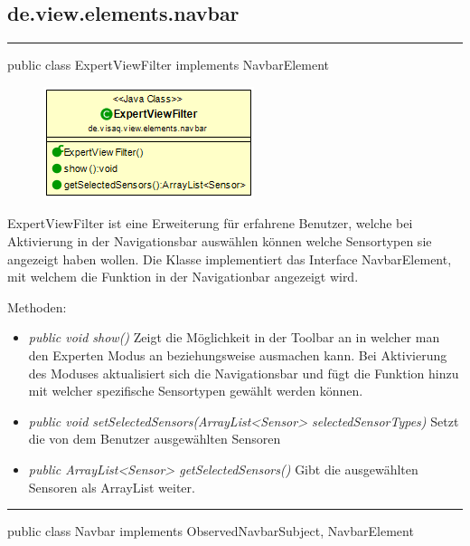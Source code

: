 \subsection{de.view.elements.navbar}

\rule{\textwidth}{0.4pt} 
public class ExpertViewFilter implements NavbarElement 

\begin{minipage}{0.3\textwidth}
    \begin{figure}[H]
        \includegraphics[scale = 0.5]{media/frontend/view/de.view.elements.navbar/ExpertviewFilter_Class.png}
    \end{figure}
    \end{minipage} \hfill
    \begin{minipage}{0.6\textwidth}
ExpertViewFilter ist eine Erweiterung für erfahrene Benutzer, welche bei Aktivierung in der Navigationsbar auswählen können welche Sensortypen sie angezeigt haben wollen. Die Klasse implementiert das Interface NavbarElement, mit welchem die Funktion in der Navigationbar angezeigt wird.
\end{minipage}

Methoden:
\begin{itemize} 
    \item \emph{public void show()} Zeigt die Möglichkeit in der Toolbar an in welcher man den Experten Modus an beziehungsweise ausmachen kann. Bei Aktivierung des Moduses aktualisiert sich die Navigationsbar und fügt die Funktion hinzu mit welcher spezifische Sensortypen gewählt werden können.
    \item \emph{public void setSelectedSensors(ArrayList<Sensor> selectedSensorTypes)} Setzt die von dem Benutzer ausgewählten Sensoren
    \item \emph{public ArrayList<Sensor> getSelectedSensors()} Gibt die ausgewählten Sensoren als ArrayList weiter.
\end{itemize}

\rule{\textwidth}{0.4pt} 
public class Navbar implements ObservedNavbarSubject, NavbarElement

